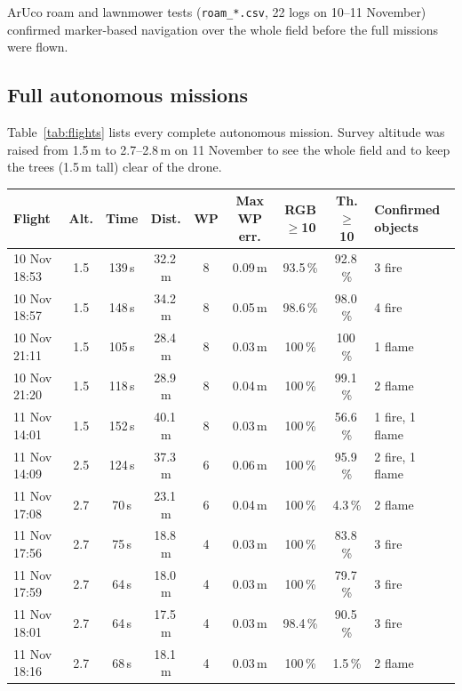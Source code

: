 \documentclass[10pt,a4paper]{article}
\newcommand{\head}[1]{\textbf{#1}}
\newcommand{\file}[1]{\texttt{\small #1}}
\begin{document}
ArUco roam and lawnmower tests (\file{roam\_*.csv}, 22 logs on 10--11 November) confirmed marker-based navigation over the
whole field before the full missions were flown.

\subsection{Full autonomous missions}
Table~\ref{tab:flights} lists every complete autonomous mission. Survey altitude was raised from 1.5\,m to 2.7--2.8\,m on
11 November to see the whole field and to keep the trees (1.5\,m tall) clear of the drone.

\begin{table}[H]
\centering
\small
\begin{tabular}{|l|c|c|c|c|c|c|c|l|}
\hline
\rowcolor{headgray}\head{Flight} & \head{Alt.} & \head{Time} & \head{Dist.} & \head{WP} & \head{Max WP err.} & \head{RGB $\ge$10} & \head{Th. $\ge$10} & \head{Confirmed objects} \\ \hline
10 Nov 18:53 & 1.5 & 139\,s & 32.2\,m & 8 & 0.09\,m & 93.5\,\% & 92.8\,\% & 3 fire \\ \hline
10 Nov 18:57 & 1.5 & 148\,s & 34.2\,m & 8 & 0.05\,m & 98.6\,\% & 98.0\,\% & 4 fire \\ \hline
10 Nov 21:11 & 1.5 & 105\,s & 28.4\,m & 8 & 0.03\,m & 100\,\% & 100\,\% & 1 flame \\ \hline
10 Nov 21:20 & 1.5 & 118\,s & 28.9\,m & 8 & 0.04\,m & 100\,\% & 99.1\,\% & 2 flame \\ \hline
11 Nov 14:01 & 1.5 & 152\,s & 40.1\,m & 8 & 0.03\,m & 100\,\% & \textcolor{failred}{56.6\,\%} & 1 fire, 1 flame \\ \hline
11 Nov 14:09 & 2.5 & 124\,s & 37.3\,m & 6 & 0.06\,m & 100\,\% & 95.9\,\% & 2 fire, 1 flame \\ \hline
11 Nov 17:08 & 2.7 & 70\,s & 23.1\,m & 6 & 0.04\,m & 100\,\% & \textcolor{failred}{4.3\,\%} & 2 flame \\ \hline
11 Nov 17:56 & 2.7 & 75\,s & 18.8\,m & 4 & 0.03\,m & 100\,\% & \textcolor{failred}{83.8\,\%} & 3 fire \\ \hline
11 Nov 17:59 & 2.7 & 64\,s & 18.0\,m & 4 & 0.03\,m & 100\,\% & \textcolor{failred}{79.7\,\%} & 3 fire \\ \hline
11 Nov 18:01 & 2.7 & 64\,s & 17.5\,m & 4 & 0.03\,m & 98.4\,\% & 90.5\,\% & 3 fire \\ \hline
11 Nov 18:16 & 2.7 & 68\,s & 18.1\,m & 4 & 0.03\,m & 100\,\% & \textcolor{failred}{1.5\,\%} & 2 flame \\ \hline

\end{tabular}
\end{table}
\end{document}
